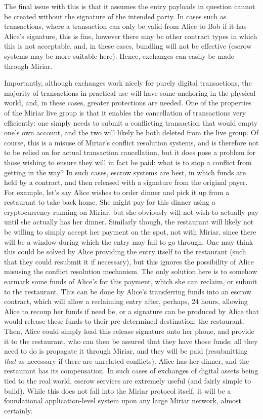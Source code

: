 \documentclass{extreport}
\begin{document}
The final issue with this is that it assumes the entry payloads in question cannot be created without the signature of the intended party. In cases such as transactions, where a transaction can only be valid from Alice to Bob if it has Alice's signature, this is fine, however there may be other contract types in which this is not acceptable, and, in these cases, bundling will not be effective (escrow systems may be more suitable here). Hence, exchanges can easily be made through Miriar.

Importantly, although exchanges work nicely for purely digital transactions, the majority of transactions in practical use will have some anchoring in the physical world, and, in these cases, greater protections are needed. One of the properties of the Miriar live group is that it enables the cancellation of transactions very efficiently: one simply needs to submit a conflicting transaction that would empty one's own account, and the two will likely be both deleted from the live group. Of course, this is a misuse of Miriar's conflict resolution systems, and is therefore not to be relied on for actual transaction cancellation, but it does pose a problem for those wishing to ensure they will in fact be paid: what is to stop a conflict from getting in the way? In such cases, escrow systems are best, in which funds are held by a contract, and then released with a signature from the original payer. For example, let's say Alice wishes to order dinner and pick it up from a restaurant to take back home. She might pay for this dinner using a cryptocurrency running on Miriar, but she obviously will not wish to actually pay until she actually has her dinner. Similarly though, the restaurant will likely not be willing to simply accept her payment on the spot, not with Miriar, since there will be a window during which the entry may fail to go through. One may think this could be solved by Alice providing the entry itself to the restaurant (such that they could resubmit it if necessary), but this ignores the possibility of Alice misusing the conflict resolution mechanism. The only solution here is to somehow earmark some funds of Alice's for this payment, which she can reclaim, or submit to the restaurant. This can be done by Alice's transferring funds into an escrow contract, which will allow a reclaiming entry after, perhaps, 24 hours, allowing Alice to recoup her funds if need be, or a signature can be produced by Alice that would release these funds to their pre-determined destination: the restaurant. Then, Alice could simply load this release signature onto her phone, and provide it to the restaurant, who can then be assured that they have those funds: all they need to do is propagate it through Miriar, and they will be paid (resubmitting \emph{that} as necessary if there are unrelated conflicts). Alice has her dinner, and the restaurant has its compensation. In such cases of exchanges of digital assets being tied to the real world, escrow services are extremely useful (and fairly simple to build). While this does not fall into the Miriar protocol itself, it will be a foundational application-level system upon any large Miriar network, almost certainly.
\end{document}
